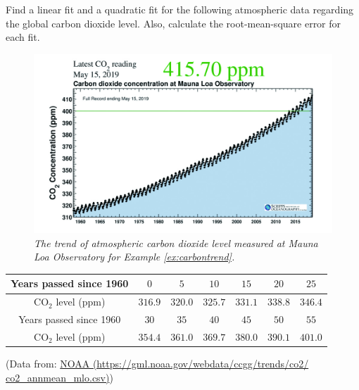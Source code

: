 \begin{Exercise}
\label{ex:carbontrend}
Find a linear fit and a quadratic fit for the following atmospheric data regarding the global carbon dioxide level. Also, calculate the root-mean-square error for each fit.
\begin{figure}[h!]
\centering
\includegraphics[scale = 0.32]{carbon.jpg}
\caption{\textit{The trend of atmospheric carbon dioxide level measured at Mauna Loa Observatory for Example \ref{ex:carbontrend}.}}
\end{figure}
\begin{center}
\begin{tabular}{|c|c|c|c|c|c|c|}
\hline
Years passed since 1960 & $0$ & $5$ & $10$ & $15$ & $20$ & $25$ \\
\hline
CO$_2$ level (ppm) & $316.9$ & $320.0$ & $325.7$ & $331.1$ & $338.8$ & $346.4$ \\
\hline
Years passed since 1960 & $30$ & $35$ & $40$ & $45$ & $50$ & $55$\\
\hline
CO$_2$ level (ppm) & $354.4$ & $361.0$ & $369.7$ & $380.0$ & $390.1$ & $401.0$\\
\hline
\end{tabular}
\end{center}
(Data from: \href{https://gml.noaa.gov/webdata/ccgg/trends/co2/co2_mm_mlo.csv}{NOAA (https://gml.noaa.gov/webdata/ccgg/trends/co2/\\co2\_annmean\_mlo.csv)})
\end{Exercise}
